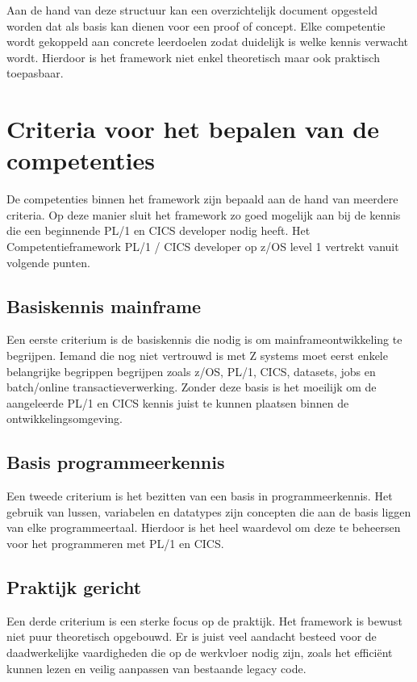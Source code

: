 Aan de hand van deze structuur kan een overzichtelijk document opgesteld worden dat als basis kan dienen voor een proof of concept.
Elke competentie wordt gekoppeld aan concrete leerdoelen zodat duidelijk is welke kennis verwacht wordt.
Hierdoor is het framework niet enkel theoretisch maar ook praktisch toepasbaar.

\section{Criteria voor het bepalen van de competenties}
\label{sec:criteria-bepalen-competenties}

De competenties binnen het framework zijn bepaald aan de hand van meerdere criteria. 
Op deze manier sluit het framework zo goed mogelijk aan bij de kennis die een beginnende PL/1 en CICS developer nodig heeft.
Het Competentieframework PL/1 / CICS developer op z/OS level 1 vertrekt vanuit volgende punten.

\subsection{Basiskennis mainframe}
\label{sec:Basiskennis-mainframeontwikkeling}

Een eerste criterium is de basiskennis die nodig is om mainframeontwikkeling te begrijpen.
Iemand die nog niet vertrouwd is met Z systems moet eerst enkele belangrijke begrippen begrijpen zoals z/OS, PL/1, CICS, datasets, jobs en batch/online transactieverwerking.
Zonder deze basis is het moeilijk om de aangeleerde PL/1 en CICS kennis juist te kunnen plaatsen binnen de ontwikkelingsomgeving.

\subsection{Basis programmeerkennis}
\label{sec:Basiskennis-programmeerkennis}

Een tweede criterium is het bezitten van een basis in programmeerkennis.
Het gebruik van lussen, variabelen en datatypes zijn concepten die aan de basis liggen van elke programmeertaal.
Hierdoor is het heel waardevol om deze te beheersen voor het programmeren met PL/1 en CICS.

\subsection{Praktijk gericht}
\label{sec:Praktijk-gericht}

Een derde criterium is een sterke focus op de praktijk.
Het framework is bewust niet puur theoretisch opgebouwd.
Er is juist veel aandacht besteed voor de daadwerkelijke vaardigheden die op de werkvloer nodig zijn, zoals het efficiënt kunnen lezen en veilig aanpassen van bestaande legacy code.

